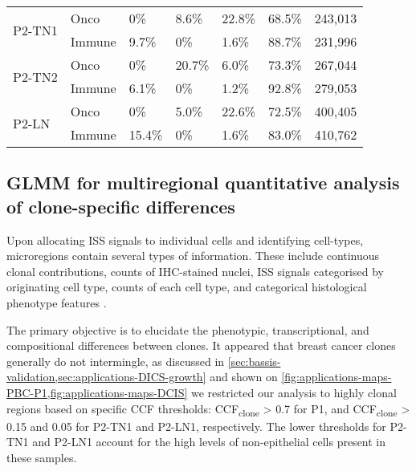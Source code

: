 {\begin{longtable}{l l l l l l l}
    \multirow{2}{*}{P2-TN1} & Onco & 0\% & 8.6\% & 22.8\% & 68.5\% & 243,013 \\
                         & Immune & 9.7\% & 0\% & 1.6\% & 88.7\% & 231,996 \\
    \multirow{2}{*}{P2-TN2} & Onco & 0\% & 20.7\% & 6.0\% & 73.3\% & 267,044 \\
                         & Immune & 6.1\% & 0\% & 1.2\% & 92.8\% & 279,053 \\
    \multirow{2}{*}{P2-LN}  & Onco & 0\% & 5.0\% & 22.6\% & 72.5\% & 400,405 \\
                         & Immune & 15.4\% & 0\% & 1.6\% & 83.0\% & 410,762 \\
    \bottomrule
\end{longtable}
}

\subsection{\acs{GLMM} for multiregional quantitative analysis of clone-specific differences}
\label{sec:modalities-glmm}

Upon allocating \ac{ISS} signals to individual cells and identifying cell-types, microregions contain several types of information. These include continuous clonal contributions, counts of \ac{IHC}-stained nuclei, \ac{ISS} signals categorised by originating cell type, counts of each cell type, and categorical histological phenotype features .


The primary objective is to elucidate the phenotypic, transcriptional, and compositional differences between clones. It appeared that breast cancer clones generally do not intermingle, as discussed in \cref{sec:bassis-validation,sec:applications-DICS-growth} and shown on \cref{fig:applications-maps-PBC-P1,fig:applications-maps-DCIS} we restricted our analysis to highly clonal regions based on specific \ac{CCF} thresholds: \ac{CCF}\textsubscript{clone} > 0.7 for P1, and \ac{CCF}\textsubscript{clone} > 0.15 and 0.05 for P2-TN1 and P2-LN1, respectively. The lower thresholds for P2-TN1 and P2-LN1 account for the high levels of non-epithelial cells present in these samples.

